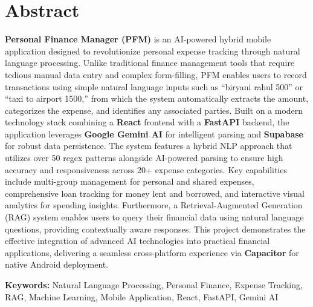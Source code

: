 
\chapter*{Abstract}

\vspace{1cm}

\textbf{Personal Finance Manager (PFM)} is an AI-powered hybrid mobile application designed to revolutionize personal expense tracking through natural language processing. Unlike traditional finance management tools that require tedious manual data entry and complex form-filling, PFM enables users to record transactions using simple natural language inputs such as ``biryani rahul 500'' or ``taxi to airport 1500,'' from which the system automatically extracts the amount, categorizes the expense, and identifies any associated parties. Built on a modern technology stack combining a \textbf{React} frontend with a \textbf{FastAPI} backend, the application leverages \textbf{Google Gemini AI} for intelligent parsing and \textbf{Supabase} for robust data persistence. The system features a hybrid NLP approach that utilizes over 50 regex patterns alongside AI-powered parsing to ensure high accuracy and responsiveness across 20+ expense categories. Key capabilities include multi-group management for personal and shared expenses, comprehensive loan tracking for money lent and borrowed, and interactive visual analytics for spending insights. Furthermore, a Retrieval-Augmented Generation (RAG) system enables users to query their financial data using natural language questions, providing contextually aware responses. This project demonstrates the effective integration of advanced AI technologies into practical financial applications, delivering a seamless cross-platform experience via \textbf{Capacitor} for native Android deployment.

\vspace{0.5cm}

\textbf{Keywords:} Natural Language Processing, Personal Finance, Expense Tracking, RAG, Machine Learning, Mobile Application, React, FastAPI, Gemini AI
